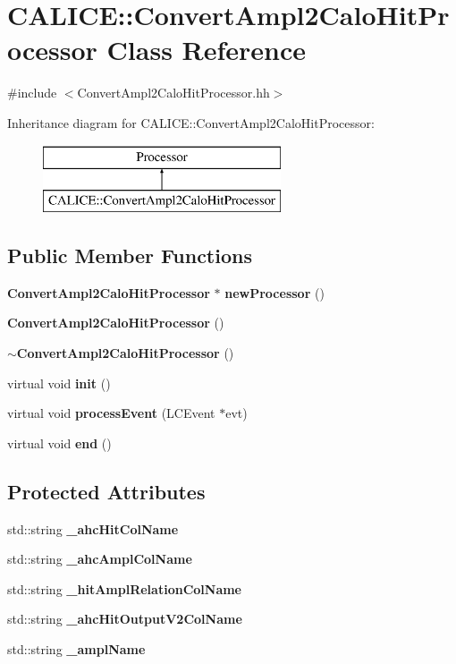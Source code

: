 \section{C\-A\-L\-I\-C\-E\-:\-:Convert\-Ampl2\-Calo\-Hit\-Processor Class Reference}
\label{classCALICE_1_1ConvertAmpl2CaloHitProcessor}


{\ttfamily \#include $<$Convert\-Ampl2\-Calo\-Hit\-Processor.\-hh$>$}

Inheritance diagram for C\-A\-L\-I\-C\-E\-:\-:Convert\-Ampl2\-Calo\-Hit\-Processor\-:\begin{figure}[H]
\begin{center}
\leavevmode
\includegraphics[height=2.000000cm]{classCALICE_1_1ConvertAmpl2CaloHitProcessor}
\end{center}
\end{figure}
\subsection*{Public Member Functions}
\begin{DoxyCompactItemize}
\item 
{\bf Convert\-Ampl2\-Calo\-Hit\-Processor} $\ast$ {\bf new\-Processor} ()
\item 
{\bf Convert\-Ampl2\-Calo\-Hit\-Processor} ()
\item 
{\bf $\sim$\-Convert\-Ampl2\-Calo\-Hit\-Processor} ()
\item 
virtual void {\bf init} ()
\item 
virtual void {\bf process\-Event} (L\-C\-Event $\ast$evt)
\item 
virtual void {\bf end} ()
\end{DoxyCompactItemize}
\subsection*{Protected Attributes}
\begin{DoxyCompactItemize}
\item 
std\-::string {\bf \-\_\-ahc\-Hit\-Col\-Name}
\item 
std\-::string {\bf \-\_\-ahc\-Ampl\-Col\-Name}
\item 
std\-::string {\bf \-\_\-hit\-Ampl\-Relation\-Col\-Name}
\item 
std\-::string {\bf \-\_\-ahc\-Hit\-Output\-V2\-Col\-Name}
\item 
std\-::string {\bf \-\_\-ampl\-Name}
\end{DoxyCompactItemize}


